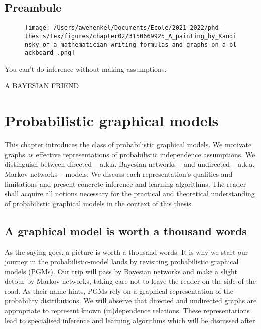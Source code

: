 \thispagestyle{empty}
\section*{Preambule}

\begin{figure}[h]
  \centering

  \texttt{[image: /Users/awehenkel/Documents/Ecole/2021-2022/phd-thesis/tex/figures/chapter02/3150669925\_A\_painting\_by\_Kandinsky\_of\_a\_mathematician\_writing\_formulas\_and\_graphs\_on\_a\_blackboard\_.png]}
  \label{}
\end{figure}

\vfill

{\centering
\parbox{\textwidth}{%
  \raggedright{

  You can't do inference without making assumptions.\par\bigskip
  }
  \raggedleft\MakeUppercase{A Bayesian friend}\par%
}}



\chapter{Probabilistic graphical models}\label{ch:02}

\begin{chapter_outline}

This chapter introduces the class of probabilistic graphical models. We motivate graphs as effective representations of probabilistic independence assumptions. We distinguish between directed -- a.k.a. Bayesian networks -- and undirected -- a.k.a. Markov networks -- models. We discuss each representation's qualities and limitations and present concrete inference and learning algorithms. The reader shall acquire all notions necessary for the practical and theoretical understanding of probabilistic graphical models in the context of this thesis.
\end{chapter_outline}

\section{A graphical model is worth a thousand words}
As the saying goes, a picture is worth a thousand words. It is why we start our journey in the probabilistic-model lands by revisiting probabilistic graphical models (PGMs). Our trip will pass by Bayesian networks and make a slight detour by Markov networks, taking care not to leave the reader on the side of the road. As their name hints, PGMs rely on a graphical representation of the probability distributions. We will observe that directed and undirected graphs are appropriate to represent known (in)dependence relations. These representations lead to specialised inference and learning algorithms which will be discussed after.

